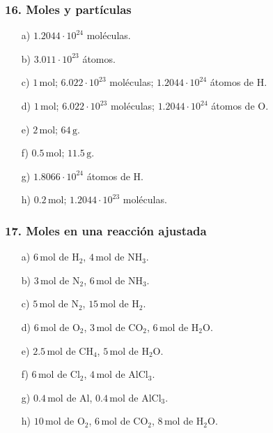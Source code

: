 \subsubsection*{16. Moles y partículas}
\begin{enumerate}
    \item[a)] $1.2044\cdot10^{24}$ moléculas.
    \item[b)] $3.011\cdot10^{23}$ átomos.
    \item[c)] $1\,\mathrm{mol}$;
    $6.022\cdot10^{23}$ moléculas;
    $1.2044\cdot10^{24}$ átomos de H.
    \item[d)] $1\,\mathrm{mol}$;
    $6.022\cdot10^{23}$ moléculas;
    $1.2044\cdot10^{24}$ átomos de O.
    \item[e)] $2\,\mathrm{mol}$; $64\,\mathrm{g}$.
    \item[f)] $0.5\,\mathrm{mol}$; $11.5\,\mathrm{g}$.
    \item[g)] $1.8066\cdot10^{24}$ átomos de H.
    \item[h)] $0.2\,\mathrm{mol}$;
    $1.2044\cdot10^{23}$ moléculas.
\end{enumerate}

\subsubsection*{17. Moles en una reacción ajustada}
\begin{enumerate}
    \item[a)] $6\,\mathrm{mol}$ de $\mathrm{H_2}$,
    $4\,\mathrm{mol}$ de $\mathrm{NH_3}$.
    \item[b)] $3\,\mathrm{mol}$ de $\mathrm{N_2}$,
    $6\,\mathrm{mol}$ de $\mathrm{NH_3}$.
    \item[c)] $5\,\mathrm{mol}$ de $\mathrm{N_2}$,
    $15\,\mathrm{mol}$ de $\mathrm{H_2}$.
    \item[d)] $6\,\mathrm{mol}$ de $\mathrm{O_2}$,
    $3\,\mathrm{mol}$ de $\mathrm{CO_2}$,
    $6\,\mathrm{mol}$ de $\mathrm{H_2O}$.
    \item[e)] $2.5\,\mathrm{mol}$ de $\mathrm{CH_4}$,
    $5\,\mathrm{mol}$ de $\mathrm{H_2O}$.
    \item[f)] $6\,\mathrm{mol}$ de $\mathrm{Cl_2}$,
    $4\,\mathrm{mol}$ de $\mathrm{AlCl_3}$.
    \item[g)] $0.4\,\mathrm{mol}$ de Al,
    $0.4\,\mathrm{mol}$ de $\mathrm{AlCl_3}$.
    \item[h)] $10\,\mathrm{mol}$ de $\mathrm{O_2}$,
    $6\,\mathrm{mol}$ de $\mathrm{CO_2}$,
    $8\,\mathrm{mol}$ de $\mathrm{H_2O}$.
\end{enumerate}

